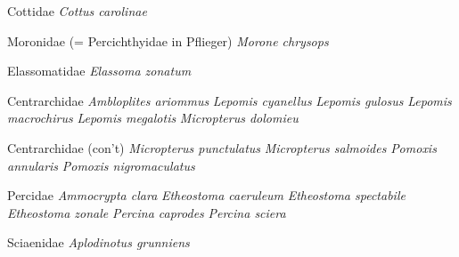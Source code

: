 \documentclass[11pt, hidelinks]{exam}
\begin{document}
\begin{multicols}{2}
Cottidae\newline
	\hspace*{1em}\textit{Cottus carolinae}

Moronidae (= Percichthyidae in Pflieger)\newline
	\hspace*{1em}\textit{Morone chrysops}

Elassomatidae\newline
	\hspace*{1em}\textit{Elassoma zonatum}

Centrarchidae\newline
	\hspace*{1em}\textit{Ambloplites ariommus}\newline
	\hspace*{1em}\textit{Lepomis cyanellus}\newline
	\hspace*{1em}\textit{Lepomis gulosus}\newline
	\hspace*{1em}\textit{Lepomis macrochirus}\newline
	\hspace*{1em}\textit{Lepomis megalotis}\newline
	\hspace*{1em}\textit{Micropterus dolomieu}

Centrarchidae (con’t)\newline
	\hspace*{1em}\textit{Micropterus punctulatus}\newline
	\hspace*{1em}\textit{Micropterus salmoides}\newline
	\hspace*{1em}\textit{Pomoxis annularis}\newline
	\hspace*{1em}\textit{Pomoxis nigromaculatus}

Percidae\newline
	\hspace*{1em}\textit{Ammocrypta clara}\newline
	\hspace*{1em}\textit{Etheostoma caeruleum}\newline
	\hspace*{1em}\textit{Etheostoma spectabile}\newline
	\hspace*{1em}\textit{Etheostoma zonale}\newline
	\hspace*{1em}\textit{Percina caprodes}\newline
	\hspace*{1em}\textit{Percina sciera}

Sciaenidae\newline
	\hspace*{1em}\textit{Aplodinotus grunniens}
\end{multicols}
\end{document}
